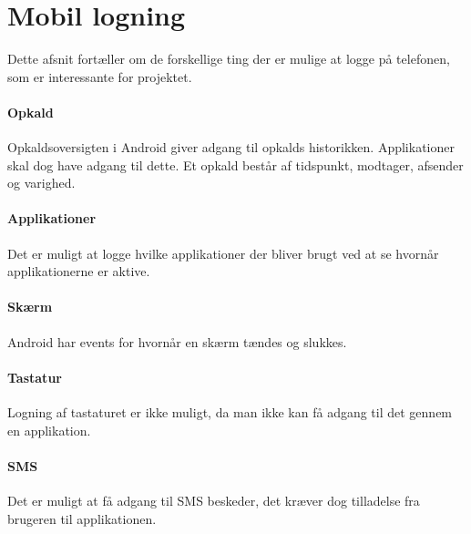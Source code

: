\section{Mobil logning}
Dette afsnit fortæller om de forskellige ting der er mulige at logge på telefonen, som er interessante for projektet.

\paragraph{Opkald}
Opkaldsoversigten i Android giver adgang til opkalds historikken.
Applikationer skal dog have adgang til dette.
Et opkald består af tidspunkt, modtager, afsender og varighed.

\paragraph{Applikationer}
Det er muligt at logge hvilke applikationer der bliver brugt ved at se hvornår applikationerne er aktive.

\paragraph{Skærm}
Android har events for hvornår en skærm tændes og slukkes.

\paragraph{Tastatur}
Logning af tastaturet er ikke muligt, da man ikke kan få adgang til det gennem en applikation.

\paragraph{SMS}
Det er muligt at få adgang til SMS beskeder, det kræver dog tilladelse fra brugeren til applikationen.
